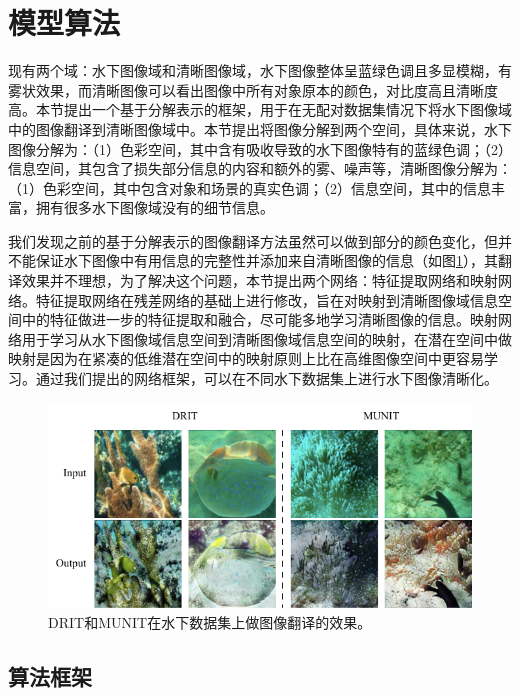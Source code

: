\section{模型算法}

现有两个域：水下图像域和清晰图像域，水下图像整体呈蓝绿色调且多显模糊，有雾状效果，而清晰图像可以看出图像中所有对象原本的颜色，对比度高且清晰度高。本节提出一个基于分解表示的框架，用于在无配对数据集情况下将水下图像域中的图像翻译到清晰图像域中。本节提出将图像分解到两个空间，具体来说，水下图像分解为：（1）色彩空间，其中含有吸收导致的水下图像特有的蓝绿色调；（2）信息空间，其包含了损失部分信息的内容和额外的雾、噪声等，清晰图像分解为：（1）色彩空间，其中包含对象和场景的真实色调；（2）信息空间，其中的信息丰富，拥有很多水下图像域没有的细节信息。

我们发现之前的基于分解表示的图像翻译方法虽然可以做到部分的颜色变化，但并不能保证水下图像中有用信息的完整性并添加来自清晰图像的信息（如图\ref{examples}），其翻译效果并不理想，为了解决这个问题，本节提出两个网络：特征提取网络和映射网络。特征提取网络在残差网络的基础上进行修改，旨在对映射到清晰图像域信息空间中的特征做进一步的特征提取和融合，尽可能多地学习清晰图像的信息。映射网络用于学习从水下图像域信息空间到清晰图像域信息空间的映射，在潜在空间中做映射是因为在紧凑的低维潜在空间中的映射原则上比在高维图像空间中更容易学习。通过我们提出的网络框架，可以在不同水下数据集上进行水下图像清晰化。

\begin{figure}[ht]
    \centering
	\includegraphics[width=\textwidth]{figs/DRIT_MUNIT_train_examples.pdf}
	\caption{DRIT和MUNIT在水下数据集上做图像翻译的效果。}
	\label{examples}
\end{figure}

\subsection{算法框架}

